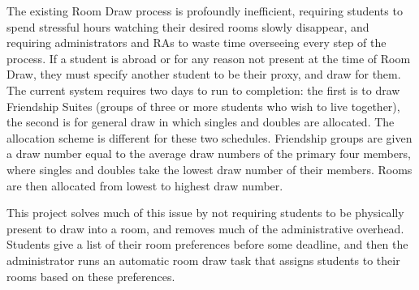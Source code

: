 The existing Room Draw process is profoundly inefficient, requiring students to
spend stressful hours watching their desired rooms slowly disappear, and
requiring administrators and RAs to waste time overseeing every step of the
process. If a student is abroad or for any reason not present at the time of
Room Draw, they must specify another student to be their proxy, and draw for
them. The current system requires two days to run to completion: the first is to
draw Friendship Suites (groups of three or more students who wish to live
together), the second is for general draw in which singles and doubles are
allocated. The allocation scheme is different for these two schedules.
Friendship groups are given a draw number equal to the average draw numbers of
the primary four members, where singles and doubles take the lowest draw number
of their members. Rooms are then allocated from lowest to highest draw number.

This project solves much of this issue by not requiring students to be
physically present to draw into a room, and removes much of the administrative
overhead. Students give a list of their room preferences before some deadline,
and then the administrator runs an automatic room draw task that assigns
students to their rooms based on these preferences.
